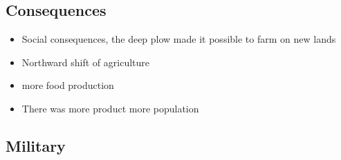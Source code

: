 \documentclass{article}
\begin{document}
\subsection{Consequences}
\begin{itemize}
  \item Social consequences, the deep plow
    made it possible to farm on new lands
  \item Northward shift of agriculture
  \item more food production
  \item There was more product \rightarrow{} more population
\end{itemize}

\subsection{Military}
\end{document}
